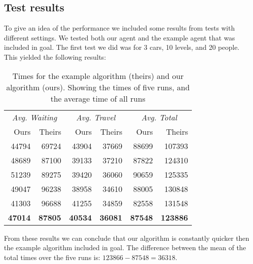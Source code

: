 \documentclass[a4paper,10pt,twocolumn]{article}
\begin{document}
\subsection{Test results}
To give an idea of the performance we included some results from tests with different settings. We tested both our agent and the example agent that was included in goal. The first test we did was for 3 cars, 10 levels, and 20 people. This yielded the following results:
\begin{table}[ht]
 \begin{tabular}{rr|rr|rr}
  \hline
  \multicolumn{2}{c|}{\emph{Avg. Waiting}} & \multicolumn{2}{c|}{\emph{Avg. Travel}} & \multicolumn{2}{c}{\emph{Avg. Total}}\\
  Ours		& Theirs	& Ours 		& Theirs & Ours & Theirs \\
  \hline
  44794 & 69724 & 43904 & 37669 & 88699 & 107393 \\
  48689 & 87100 & 39133 & 37210 & 87822	& 124310 \\
  51239 & 89275	& 39420 & 36060	& 90659 & 125335 \\
  49047 & 96238 & 38958 & 34610 & 88005 & 130848 \\
  41303 & 96688	& 41255 & 34859	& 82558 & 131548 \\
  \hline
  \textbf{47014} & \textbf{87805} & \textbf{40534} & \textbf{36081} & \textbf{87548} & \textbf{123886}\\  
\hline

 \end{tabular}
 \caption{Times for the example algorithm (theirs) and our algorithm (ours). Showing the times of five runs, and the average time of all runs}
 \label{tbl:3car_10lev_20pop_results}
\end{table}

From these results we can conclude that our algorithm is constantly quicker then the example algorithm included in goal. The difference between the mean of the total times over the five runs is: $123866 - 87548 = 36318$.
\end{document}

